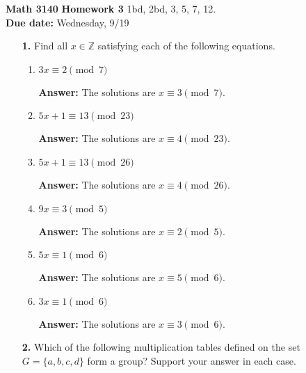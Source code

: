 \documentclass[12pt,reqno]{amsart}
\begin{document}
\thispagestyle{empty}

\noindent \textbf{Math 3140} \hfill {\bf Homework 3} 
\vskip1cm
 1bd, 2bd, 3, 5, 7, 12.  
\\
{\bf Due date:} Wednesday, 9/19

\medskip

\begin{enumerate}

\item[{\bf 1.}]
Find all $x \in {\mathbb Z}$ satisfying each of the following equations.
\begin{multicols}{2}
\begin{enumerate}

\item 
$3x \equiv 2 \pmod{ 7}$

\textbf{Answer:} The solutions are $x \equiv 3 \pmod{7}$.

\item
$5x + 1 \equiv 13 \pmod{ 23}$

\textbf{Answer:} The solutions are $x \equiv 4 \pmod{23}$.

\item
$5x + 1 \equiv 13 \pmod{ 26}$

\textbf{Answer:} The solutions are $x \equiv 4 \pmod{26}$.

\item
$9x \equiv 3 \pmod{ 5}$

\textbf{Answer:} The solutions are $x \equiv 2 \pmod{5}$.

\item
$5x \equiv 1 \pmod{ 6}$

\textbf{Answer:} The solutions are $x \equiv 5 \pmod{6}$.

\item
$3x \equiv 1 \pmod{ 6}$

\textbf{Answer:} The solutions are $x \equiv 3 \pmod{6}$.

\end{enumerate}
\end{multicols}

\medskip
\item[{\bf 2.}]
Which of the following multiplication tables defined on the set $G =
\{ a, b, c, d \}$ form a group? Support your answer in each case. 
\begin{multicols}{2}
\begin{enumerate}


\end{enumerate}
\end{multicols}
\end{enumerate}
\end{document}

